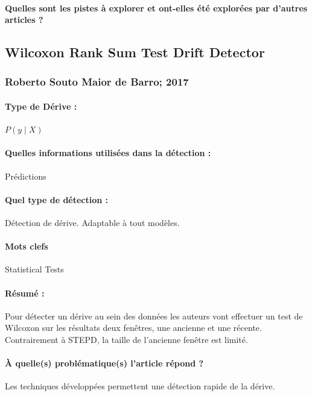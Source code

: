 \documentclass[11pt,a4paper]{report}
\begin{document}
\paragraph{Quelles sont les pistes à explorer et ont-elles  été explorées par d'autres articles ?}








\subsection{Wilcoxon Rank Sum Test Drift Detector}
\subsubsection{Roberto Souto Maior de Barro; 2017}

\paragraph{Type de Dérive :} $P(y\mid X)$
\paragraph{Quelles informations utilisées dans la détection :} Prédictions
\paragraph{Quel type de détection :} Détection de dérive. Adaptable à tout modèles.

\paragraph{Mots clefs} Statistical Tests

\paragraph{Résumé :} Pour détecter un dérive au sein des données les auteurs vont effectuer un test de Wilcoxon sur les résultats deux fenêtres, une ancienne et une récente.
Contrairement à STEPD, la taille de l'ancienne fenêtre est limité.

\paragraph{À quelle(s) problématique(s) l'article répond ?} Les techniques développées permettent une détection rapide de la dérive. 
\end{document}
